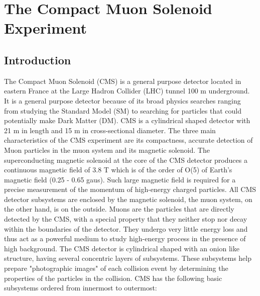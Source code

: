 



\section{The Compact Muon Solenoid Experiment}
\subsection{Introduction}
The Compact Muon Solenoid (CMS) is a general purpose detector located in eastern France at the Large Hadron Collider (LHC) tunnel 100 m underground. It is a general purpose detector because of its broad physics searches ranging from studying the Standard Model (SM) to searching for particles that could potentially make Dark Matter (DM). CMS is a cylindrical shaped detector with 21 m in length and 15 m in cross-sectional diameter. The three main characteristics of the CMS experiment are its compactness, accurate detection of Muon particles in the muon system and its magnetic solenoid. The superconducting magnetic solenoid at the core of the CMS detector produces a continuous magnetic field of 3.8 T which is of the order of O(5) of Earth's magnetic field (0.25 - 0.65 gaus). Such large magnetic field is required for a precise measurement of the momentum of high-energy charged particles. All CMS detector subsystems are enclosed by the magnetic solenoid, the muon system, on the other hand, is on the outside. Muons are the particles that are directly detected by the CMS, with a special property that they neither stop nor decay within the boundaries of the detector. They undergo very little energy loss and thus act as a powerful medium to study high-energy process in the presence of high background.
The CMS detector is cylindrical shaped with an onion like structure, having several concentric layers of subsystems. These subsystems help prepare "photographic images" of each collision event by determining the properties of the particles in the collision. CMS has the following basic subsystems ordered from innermost to outermost:

